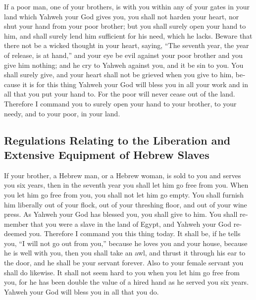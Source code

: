 \begin{paracol}{2}
\begin{otherlanguage}{english}
 If a poor man, one of your brothers, is with you within
any of your gates in your land which Yahweh your God gives you, you
shall not harden your heart, nor shut your hand from your poor brother;
 but you shall surely open your hand to him, and shall
surely lend him sufficient for his need, which he lacks. 
Beware that there not be a wicked thought in your heart, saying, ``The
seventh year, the year of release, is at hand,'' and your eye be evil
against your poor brother and you give him nothing; and he cry to Yahweh
against you, and it be sin to you.  You shall surely
give, and your heart shall not be grieved when you give to him, because
it is for this thing Yahweh your God will bless you in all your work and
in all that you put your hand to.  For the poor will
never cease out of the land. Therefore I command you to surely open your
hand to your brother, to your needy, and to your poor, in your land.

\hypertarget{regulations-relating-to-the-liberation-and-extensive-equipment-of-hebrew-slaves}{%
\subsection{Regulations Relating to the Liberation and Extensive
Equipment of Hebrew
Slaves}\label{regulations-relating-to-the-liberation-and-extensive-equipment-of-hebrew-slaves}}

 If your brother, a Hebrew man, or a Hebrew woman, is
sold to you and serves you six years, then in the seventh year you shall
let him go free from you.  When you let him go free from
you, you shall not let him go empty.  You shall furnish
him liberally out of your flock, out of your threshing floor, and out of
your wine press. As Yahweh your God has blessed you, you shall give to
him.  You shall remember that you were a slave in the
land of Egypt, and Yahweh your God redeemed you. Therefore I command you
this thing today.  It shall be, if he tells you, ``I will
not go out from you,'' because he loves you and your house, because he
is well with you,  then you shall take an awl, and thrust
it through his ear to the door, and he shall be your servant forever.
Also to your female servant you shall do likewise.  It
shall not seem hard to you when you let him go free from you, for he has
been double the value of a hired hand as he served you six years. Yahweh
your God will bless you in all that you do.


\end{otherlanguage}
\end{paracol}
